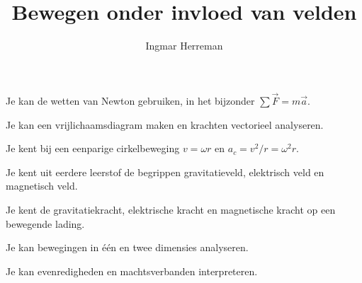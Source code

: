 \documentclass{ximera}
\title{Bewegen onder invloed van velden}
\author{Ingmar Herreman}
\begin{document}





\maketitle


\begin{voorkennis}
  \item Je kan de wetten van Newton gebruiken, in het bijzonder
        $\sum\vec F=m\vec a$.
  \item Je kan een vrijlichaamsdiagram maken en krachten vectorieel analyseren.
  \item Je kent bij een eenparige cirkelbeweging
        $v=\omega r$ en $a_c=v^2/r=\omega^2r$.
  \item Je kent uit eerdere leerstof de begrippen gravitatieveld,
        elektrisch veld en magnetisch veld.
  \item Je kent de gravitatiekracht, elektrische kracht en magnetische
        kracht op een bewegende lading.
  \item Je kan bewegingen in één en twee dimensies analyseren.
  \item Je kan evenredigheden en machtsverbanden interpreteren.
\end{voorkennis}
\end{document}
